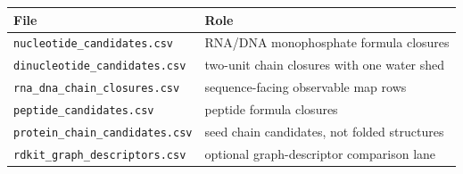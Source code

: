 \begin{center}
\begin{tabularx}{\linewidth}{@{}lX@{}}
\toprule
File & Role \\
\midrule
\texttt{nucleotide\_candidates.csv} & RNA/DNA monophosphate formula closures \\
\texttt{dinucleotide\_candidates.csv} & two-unit chain closures with one water shed \\
\texttt{rna\_dna\_chain\_closures.csv} & sequence-facing observable map rows \\
\texttt{peptide\_candidates.csv} & peptide formula closures \\
\texttt{protein\_chain\_candidates.csv} & seed chain candidates, not folded structures \\
\texttt{rdkit\_graph\_descriptors.csv} & optional graph-descriptor comparison lane \\
\bottomrule
\end{tabularx}
\end{center}
